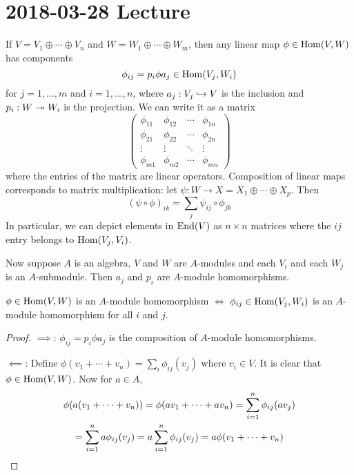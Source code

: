 \section{2018-03-28 Lecture}

\begin{prop}
	If $V = V_1 \oplus \cdots \oplus V_n$ and $W = W_1 \oplus \cdots \oplus W_m$, then any linear map $\phi \in \operatorname{Hom}(V,W)$ has components
    \[\phi_{ij} = p_i \phi a_j \in \operatorname{Hom}(V_j,W_i)\]
    for $j=1,\ldots,m$ and $i=1,\ldots,n$, where $a_j: V_j \hookrightarrow V$ is the inclusion and $p_i: W \twoheadrightarrow W_i$ is the projection.
    We can write it as a matrix
    \[
    \begin{pmatrix}
    	\phi_{11} & \phi_{12} & \cdots & \phi_{1n} \\
        \phi_{21} & \phi_{22} & \cdots & \phi_{2n} \\
        \vdots & \vdots & \ddots & \vdots \\
        \phi_{m1} & \phi_{m2} & \cdots & \phi_{mn}
    \end{pmatrix}
    \]
    where the entries of the matrix are linear operators.
    Composition of linear maps corresponds to matrix multiplication: let $\psi: W \to X = X_1 \oplus \cdots \oplus X_p$.
    Then
    \[(\psi\circ\phi)_{ik} = \sum_j \psi_{ij} \circ \phi_{jk}\]
    In particular, we can depict elements in $\operatorname{End}(V)$ as $n \times n$ matrices where the $ij$ entry belongs to $\operatorname{Hom}(V_j,V_i)$.
    
	Now suppose $A$ is an algebra, $V$ and $W$ are $A$-modules and each $V_i$ and each $W_j$ is an $A$-submodule.
    Then $a_j$ and $p_i$ are $A$-module homomorphisms.
\end{prop}

\begin{prop}
	$\phi \in \operatorname{Hom}(V,W)$ is an $A$-module homomorphism $\iff$ $\phi_{ij} \in \operatorname{Hom}(V_j,W_i)$ is an $A$-module homomorphism for all $i$ and $j$.
\end{prop}

\begin{proof}
	$\implies$: $\phi_{ij} = p_i \phi a_j$ is the composition of $A$-module homomorphisms.
    
    $\impliedby$: Define $\phi(v_1+\cdots+v_n) = \sum_i \phi_{ij}(v_j)$ where $v_i \in V$.
    It is clear that $\phi \in \operatorname{Hom}(V,W)$.
    Now for $a \in A$,
    \begin{multline*}
    	\phi(a(v_1+\cdots+v_n)) = \phi(av_1+\cdots+av_n) = \sum_{i=1}^n \phi_{ij}(av_j) \\
    	= \sum_{i=1}^n a \phi_{ij}(v_j) = a \sum_{i=1}^n \phi_{ij}(v_j) = a\phi(v_1+\cdots+v_n) \qedhere
    \end{multline*}
\end{proof}

